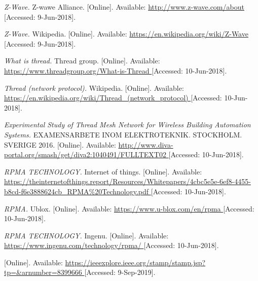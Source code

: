 \begin{thebibliography}{9}

\textit{
Z-Wave.
}
Z-wawe Alliance.
[Online]. Available:
\url{
http://www.z-wave.com/about
}
[Accessed: 9-Jun-2018].


\textit{
Z-Wave.
}
Wikipedia.
[Online]. Available:
\url{
https://en.wikipedia.org/wiki/Z-Wave
}
[Accessed: 9-Jun-2018].



\textit{
What is thread.
}
Thread group.
[Online]. Available:
\url{
https://www.threadgroup.org/What-is-Thread
}
[Accessed: 10-Jun-2018].


\textit{
Thread (network protocol).
}
Wikipedia.
[Online]. Available:
\url{
https://en.wikipedia.org/wiki/Thread_(network_protocol)
}
[Accessed: 10-Jun-2018].


\textit{
Experimental Study of Thread
Mesh Network for Wireless
Building Automation Systems.
}
EXAMENSARBETE INOM ELEKTROTEKNIK. STOCKHOLM. SVERIGE 2016.
[Online]. Available:
\url{
http://www.diva-portal.org/smash/get/diva2:1040491/FULLTEXT02
}
[Accessed: 10-Jun-2018].




\textit{
RPMA TECHNOLOGY.
}
Internet of things.
[Online]. Available:
\url{
https://theinternetofthings.report/Resources/Whitepapers/4cbc5e5e-6ef8-4455-b8cd-f6e3888624cb_RPMA\%20Technology.pdf
}
[Accessed: 10-Jun-2018].

\textit{
RPMA.
}
Ublox.
[Online]. Available:
\url{
https://www.u-blox.com/en/rpma
}
[Accessed: 10-Jun-2018].

\textit{
RPMA TECHNOLOGY.
}
Ingenu.
[Online]. Available:
\url{
https://www.ingenu.com/technology/rpma/
}
[Accessed: 10-Jun-2018].



[Online]. Available:
\url{
https://ieeexplore.ieee.org/stamp/stamp.jsp?tp=&arnumber=8399666
}
[Accessed: 9-Sep-2019].








\end{thebibliography}
